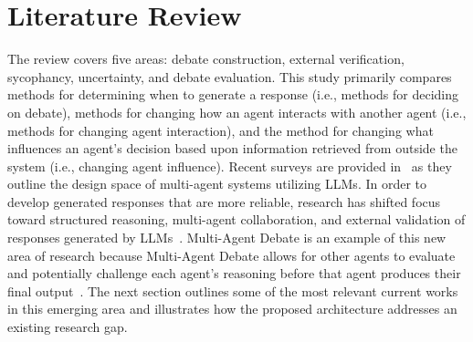 \section{Literature Review}\label{sec:literature-review}
The review covers five areas: debate construction, external verification, sycophancy, uncertainty, and debate evaluation. This study primarily compares methods for determining when to generate a response (i.e., methods for deciding on debate), methods for changing how an agent interacts with another agent (i.e., methods for changing agent interaction), and the method for changing what influences an agent's decision based upon information retrieved from outside the system (i.e., changing agent influence). Recent surveys are provided in~\cite{li2024survey} as they outline the design space of multi-agent systems utilizing LLMs. In order to develop generated responses that are more reliable, research has shifted focus toward structured reasoning, multi-agent collaboration, and external validation of responses generated by LLMs~\cite{zhang2025from}. Multi-Agent Debate is an example of this new area of research because Multi-Agent Debate allows for other agents to evaluate and potentially challenge each agent's reasoning before that agent produces their final output~\cite{du2024improving}. The next section outlines some of the most relevant current works in this emerging area and illustrates how the proposed architecture addresses an existing research gap.

